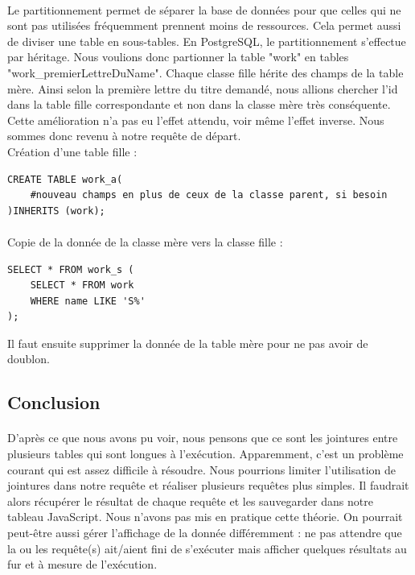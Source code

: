 \documentclass{report}
\begin{document}
	\paragraph{}{
		Le partitionnement permet de séparer la base de données pour que celles qui ne sont pas utilisées fréquemment prennent moins de ressources. Cela permet aussi de diviser une table en sous-tables. En PostgreSQL, le partitionnement s'effectue par héritage. Nous voulions donc partionner la table "work" en tables "work\_premierLettreDuName". Chaque classe fille hérite des champs de la table mère. Ainsi selon la première lettre du titre demandé, nous allions chercher l'id dans la table fille correspondante et non dans la classe mère très conséquente. Cette amélioration n'a pas eu l'effet attendu, voir même l'effet inverse. Nous sommes donc revenu à notre requête de départ.\\
		
		Création d'une table fille :

\begin{lstlisting}
CREATE TABLE work_a(
	#nouveau champs en plus de ceux de la classe parent, si besoin
)INHERITS (work);

\end{lstlisting}
}
	\paragraph{}{
	Copie de la donnée de la classe mère vers la classe fille : 

\begin{lstlisting}
SELECT * FROM work_s (
	SELECT * FROM work
	WHERE name LIKE 'S%'
);
\end{lstlisting}

	Il faut ensuite supprimer la donnée de la table mère pour ne pas avoir de doublon.

	}

	\subsection*{Conclusion}
	\paragraph{}{
		D'après ce que nous avons pu voir, nous pensons que ce sont les jointures entre plusieurs tables qui sont longues à l'exécution. Apparemment, c'est un problème courant qui est assez difficile à résoudre. Nous pourrions limiter l'utilisation de jointures dans notre requête et réaliser plusieurs requêtes plus simples. Il faudrait alors récupérer le résultat de chaque requête et les sauvegarder dans notre tableau JavaScript. Nous n'avons pas mis en pratique cette théorie.
		On pourrait peut-être aussi gérer l'affichage de la donnée différemment : ne pas attendre que la ou les requête(s) ait/aient fini de s'exécuter mais afficher quelques résultats au fur et à mesure de l'exécution.
	}
	
\end{document}
